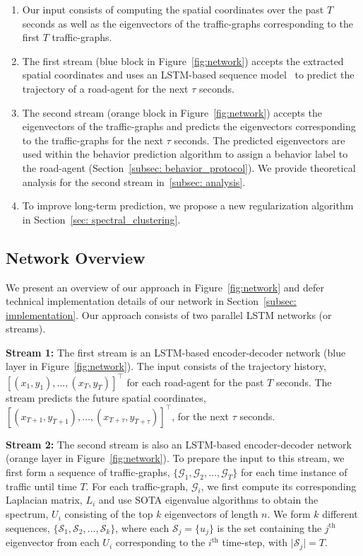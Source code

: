 \documentclass[10pt,twocolumn,letterpaper]{article}
\newcommand{\mc}[1]{\mathcal{#1}}
\newcommand{\vts}[1]{\lvert #1 \rvert}
\theoremstyle{plain}
\begin{document}
\begin{enumerate}[noitemsep]
    \item Our input consists of computing the spatial coordinates over the past $T$ seconds as well as the eigenvectors of the traffic-graphs corresponding to the first $T$ traffic-graphs.
    
    \item The first stream (blue block in Figure~\ref{fig:network}) accepts the extracted spatial coordinates and uses an LSTM-based sequence model~\cite{graves2013generating} to predict the trajectory of a road-agent for the next $\tau$ seconds.
    
    \item The second stream (orange block in Figure~\ref{fig:network}) accepts the eigenvectors of the traffic-graphs and predicts the eigenvectors corresponding to the traffic-graphs for the next $\tau$ seconds. The predicted eigenvectors are used within the behavior prediction algorithm to assign a behavior label to the road-agent (Section~\ref{subsec: behavior_protocol}). We provide theoretical analysis for the second stream in~\ref{subsec: analysis}.
    
    \item To improve long-term prediction, we propose a new regularization algorithm in Section~\ref{sec: spectral_clustering}.
\end{enumerate}


\subsection{Network Overview}

We present an overview of our approach in Figure~\ref{fig:network} and defer technical implementation details of our network in Section~\ref{subsec: implementation}. Our approach consists of two parallel LSTM networks (or streams). 


\textbf{Stream 1:} The first stream is an LSTM-based encoder-decoder network (blue layer in Figure~\ref{fig:network}). The input consists of the trajectory history, $ [(x_{1},y_{1}),\ldots,(x_{T},y_{T})]^\top$ for each road-agent for the past $T$ seconds. The stream predicts the future spatial coordinates, $[(x_{T+1},y_{T+1}),\ldots,(x_{T+\tau},y_{T+\tau})]^\top$, for the next $\tau$ seconds.

\textbf{Stream 2:} The second stream is also an LSTM-based encoder-decoder network (orange layer in Figure~\ref{fig:network}). To prepare the input to this stream, we first form a sequence of traffic-graphs, $\{\mc{G}_1, \mc{G}_2, \ldots, \mc{G}_T\}$ for each time instance of traffic until time $T$. For each traffic-graph, $\mc{G}_i$, we first compute its corresponding Laplacian matrix, $L_i$ and use SOTA eigenvalue algorithms to obtain the spectrum, $U_i$ consisting of the top $k$ eigenvectors of length $n$. We form $k$ different sequences, $\{\mc{S}_1, \mc{S}_2, \ldots, \mc{S}_k\}$, where each $\mc{S}_j = \{u_j\}$ is the set containing the $j^{\textrm{th}}$ eigenvector from each $U_i$ corresponding to the $i^{\textrm{th}}$ time-step, with $\vts{\mc{S}_j} = T$. 
\end{document}

